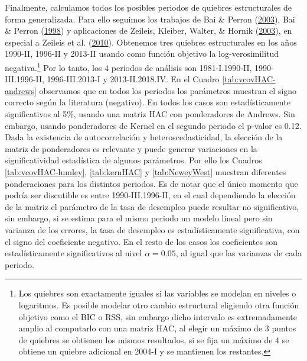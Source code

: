 \documentclass[12pt,oneside]{reedthesis}
\begin{document}
Finalmente, calculamos todos los posibles periodos de quiebres estructurales de forma generalizada. Para ello seguimos los trabajos de Bai \& Perron (\protect\hyperlink{ref-BaiPerron2003}{2003}), Bai \& Perron (\protect\hyperlink{ref-BaiPerron1998}{1998}) y aplicaciones de Zeileis, Kleiber, Walter, \& Hornik (\protect\hyperlink{ref-Zeileis2003}{2003}), en especial a Zeileis et al. (\protect\hyperlink{ref-Zeileis2010}{2010}). Obtenemos tres quiebres estructurales en los años 1990-II, 1996-II y 2013-II usando como función objetivo la log-verosimilitud negativa.\footnote{Los quiebres son exactamente iguales si las variables se modelan en niveles o logaritmos. Es posible modelar otro cambio estructural eligiendo otra función objetivo como el BIC o RSS, sin embargo dicho intervalo es extremadamente amplio al computarlo con una matriz HAC, al elegir un máximo de 3 puntos de quiebres se obtienen los mismos resultados, si se fija un máximo de 4 se obtiene un quiebre adicional en 2004-I y se mantienen los restantes.} Por lo tanto, los 4 periodos de análisis son 1981-I.1990-II, 1990-III.1996-II, 1996-III.2013-I y 2013-II.2018.IV. En el Cuadro \ref{tab:vcovHAC-andrews} observamos que en todos los periodos los parámetros muestran el signo correcto según la literatura (negativo). En todos los casos son estadísticamente significativos al 5\%, usando una matriz HAC con ponderadores de Andrews. Sin embargo, usando ponderadores de Kernel en el segundo periodo el p-valor es 0.12. Dada la existencia de autocorrelación y heteroscedasticidad, la elección de la matriz de ponderadores es relevante y puede generar variaciones en la significatividad estadística de algunos parámetros. Por ello los Cuadros \ref{tab:vcovHAC-lumley}, \ref{tab:kernHAC} y \ref{tab:NeweyWest} muestran diferentes ponderaciones para los distintos periodos. Es de notar que el único momento que podría ser discutible es entre 1990-III.1996-II, en el cual dependiendo la elección de la matriz el parámetro de la tasa de desempleo puede resultar no significativo, sin embargo, si se estima para el mismo periodo un modelo lineal pero sin varianza de los errores, la tasa de desempleo es estadísticamente significativa, con el signo del coeficiente negativo. En el resto de los casos los coeficientes son estadísticamente significativos al nivel \(\alpha = 0.05\), al igual que las varianzas de cada periodo.
\end{document}
